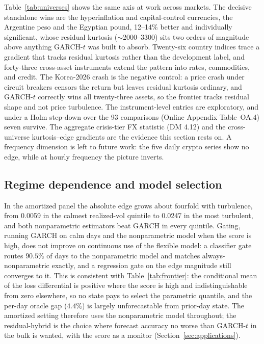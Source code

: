 \documentclass[11pt]{article}
\theoremstyle{remark}
\begin{document}
Table~\ref{tab:universes} shows the same axis at work across markets.
The decisive standalone wins are the hyperinflation and capital-control
currencies, the Argentine peso and the Egyptian pound, 12--14\% better
and individually significant, whose residual kurtosis ($\sim$2000--3300)
sits two orders of magnitude above anything GARCH-$t$ was built to
absorb. Twenty-six country indices trace a gradient that tracks residual
kurtosis rather than the development label, and forty-three cross-asset
instruments extend the pattern into rates, commodities, and credit. The
Korea-2026 crash is the negative control: a price crash under circuit
breakers censors the return but leaves residual kurtosis ordinary, and
GARCH-$t$ correctly wins all twenty-three assets, so the frontier tracks
residual shape and not price turbulence. The instrument-level entries are
exploratory, and under a Holm step-down over the 93 comparisons (Online
Appendix Table~OA.4) seven survive. The aggregate crisis-tier FX
statistic (DM 4.12) and the cross-universe kurtosis--edge gradients are
the evidence this section rests on. A frequency dimension is left to
future work: the five daily crypto series show no edge, while at hourly
frequency the picture inverts.

\subsection{Regime dependence and model selection}
\label{sec:gate}

In the amortized panel the absolute edge grows about fourfold with
turbulence, from 0.0059 in the calmest realized-vol quintile to 0.0247 in
the most turbulent, and both nonparametric estimators beat GARCH in every
quintile. Gating, running GARCH on calm days and the nonparametric model
when the score is high, does not improve on continuous use of the
flexible model: a classifier gate routes $90.5\%$ of days to the
nonparametric model and matches always-nonparametric exactly, and a
regression gate on the edge magnitude \citep{giacominiwhite2006} still
converges to it. This is consistent with Table~\ref{tab:frontier}: the
conditional mean of the loss differential is positive where the score is
high and indistinguishable from zero elsewhere, so no state pays to
select the parametric quantile, and the per-day oracle gap ($4.4\%$) is largely unforecastable from prior-day state. The amortized setting therefore uses the nonparametric
model throughout; the residual-hybrid is the choice where forecast accuracy no worse than GARCH-$t$ in the bulk is wanted, with the score as a monitor
(Section~\ref{sec:applications}).
\end{document}
